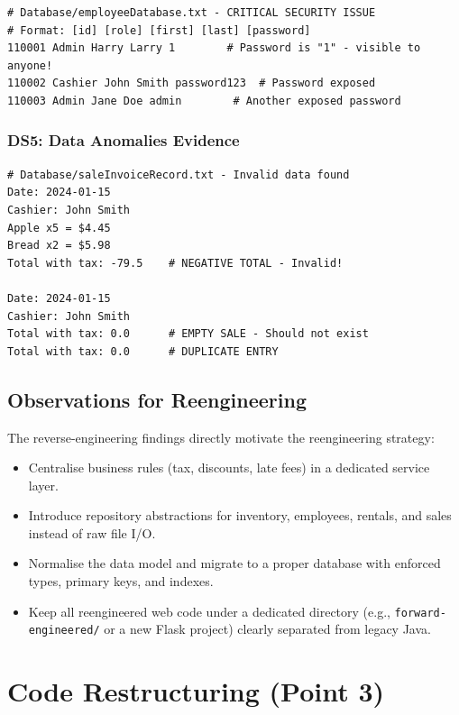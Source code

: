 \begin{lstlisting}
# Database/employeeDatabase.txt - CRITICAL SECURITY ISSUE
# Format: [id] [role] [first] [last] [password]
110001 Admin Harry Larry 1        # Password is "1" - visible to anyone!
110002 Cashier John Smith password123  # Password exposed
110003 Admin Jane Doe admin        # Another exposed password
\end{lstlisting}

\subsection{DS5: Data Anomalies Evidence}

\begin{lstlisting}
# Database/saleInvoiceRecord.txt - Invalid data found
Date: 2024-01-15
Cashier: John Smith
Apple x5 = $4.45
Bread x2 = $5.98
Total with tax: -79.5    # NEGATIVE TOTAL - Invalid!

Date: 2024-01-15
Cashier: John Smith
Total with tax: 0.0      # EMPTY SALE - Should not exist
Total with tax: 0.0      # DUPLICATE ENTRY
\end{lstlisting}

\section{Observations for Reengineering}

The reverse-engineering findings directly motivate the reengineering
strategy:

\begin{itemize}[leftmargin=1.2cm]
  \item Centralise business rules (tax, discounts, late fees) in a
        dedicated service layer.
  \item Introduce repository abstractions for
        inventory, employees, rentals, and sales instead of raw file I/O.
  \item Normalise the data model and migrate to a proper database with
        enforced types, primary keys, and indexes.
  \item Keep all reengineered web code under a dedicated directory
        (e.g., \texttt{forward-engineered/} or a new Flask project)
        clearly separated from legacy Java.
\end{itemize}

\chapter{Code Restructuring (Point 3)}

